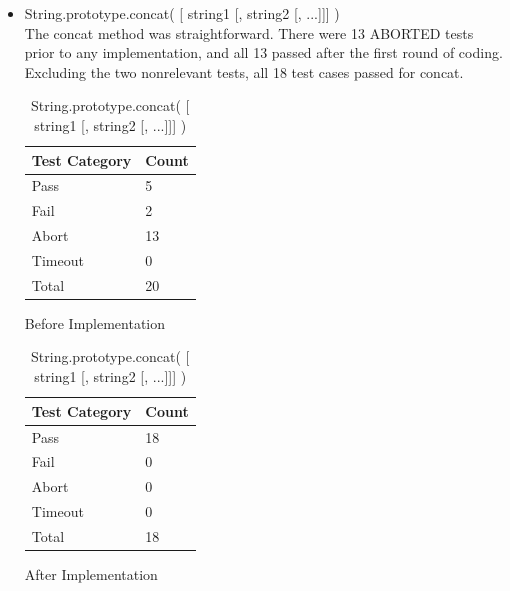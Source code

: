 \documentclass[a4paper,11pt,twoside]{report}
\begin{document}
\begin{itemize}
\item String.prototype.concat( [ string1 [, string2 [, ...]]] ) \\
The concat method was straightforward. There were 13 ABORTED tests prior to any implementation, and all 13 passed after the first round of coding. Excluding the two nonrelevant tests, all 18 test cases passed for concat.
\begin{table}[ht!]
\centering
\begin{subtable}{0.5\textwidth}
\centering
\begin{tabular}{|p{3cm}|p{2cm}|} \hline
\textbf{Test Category} & \textbf{Count} \\ \hline
Pass & 5 \\
Fail & 2 \\
Abort & 13 \\
Timeout & 0 \\
Total & 20 \\ \hline
\end{tabular}
\caption{Before Implementation}
\end{subtable}%
\begin{subtable}{0.5\textwidth}
\centering
\begin{tabular}{|p{3cm}|p{2cm}|} \hline
\textbf{Test Category} & \textbf{Count} \\ \hline
Pass & 18 \\
Fail & 0 \\
Abort & 0 \\
Timeout & 0 \\
Total & 18 \\ \hline
\end{tabular}
\caption{After Implementation}
\end{subtable}
\caption{String.prototype.concat( [ string1 [, string2 [, ...]]] )}
\end{table}


\end{itemize}
\end{document}
